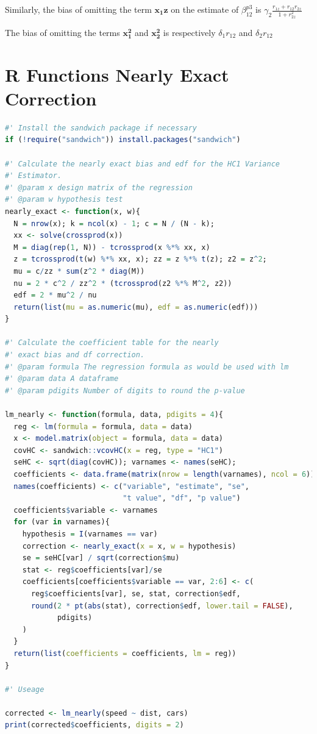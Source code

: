 \documentclass[12pt]{article}
\begin{document}
Similarly, the bias of omitting the term $\mathbf{x_1 z}$ on the estimate of $\beta^{p3}_{12}$ is  $\gamma_2 \frac{r_{1z} + r_{12} r_{2z}}{1 + r_{2z}^2}$

The bias of omitting the terms $\mathbf{x_1^2}$ and $\mathbf{x_2^2}$ is respectively $\delta_1 r_{12}$ and $\delta_2 r_{12}$

\newpage
\section{R Functions Nearly Exact Correction} \label{appendix-R}
\begin{lstlisting}[language=R]
#' Install the sandwich package if necessary
if (!require("sandwich")) install.packages("sandwich")

#' Calculate the nearly exact bias and edf for the HC1 Variance
#' Estimator.
#' @param x design matrix of the regression
#' @param w hypothesis test
nearly_exact <- function(x, w){
  N = nrow(x); k = ncol(x) - 1; c = N / (N - k);
  xx <- solve(crossprod(x))
  M = diag(rep(1, N)) - tcrossprod(x %*% xx, x)
  z = tcrossprod(t(w) %*% xx, x); zz = z %*% t(z); z2 = z^2;
  mu = c/zz * sum(z^2 * diag(M))
  nu = 2 * c^2 / zz^2 * (tcrossprod(z2 %*% M^2, z2))
  edf = 2 * mu^2 / nu
  return(list(mu = as.numeric(mu), edf = as.numeric(edf)))
}

#' Calculate the coefficient table for the nearly
#' exact bias and df correction.
#' @param formula The regression formula as would be used with lm
#' @param data A dataframe
#' @param pdigits Number of digits to round the p-value

lm_nearly <- function(formula, data, pdigits = 4){
  reg <- lm(formula = formula, data = data)
  x <- model.matrix(object = formula, data = data)
  covHC <- sandwich::vcovHC(x = reg, type = "HC1")
  seHC <- sqrt(diag(covHC)); varnames <- names(seHC); 
  coefficients <- data.frame(matrix(nrow = length(varnames), ncol = 6))
  names(coefficients) <- c("variable", "estimate", "se",
                           "t value", "df", "p value")
  coefficients$variable <- varnames
  for (var in varnames){
    hypothesis = I(varnames == var)
    correction <- nearly_exact(x = x, w = hypothesis)
    se = seHC[var] / sqrt(correction$mu)
    stat <- reg$coefficients[var]/se
    coefficients[coefficients$variable == var, 2:6] <- c(
      reg$coefficients[var], se, stat, correction$edf, 
      round(2 * pt(abs(stat), correction$edf, lower.tail = FALSE),
            pdigits)
    )
  }
  return(list(coefficients = coefficients, lm = reg))
}

#' Useage

corrected <- lm_nearly(speed ~ dist, cars)
print(corrected$coefficients, digits = 2)
\end{lstlisting}
\end{document}
